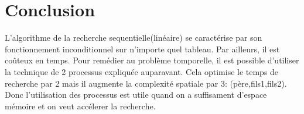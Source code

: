 \section{Conclusion}
L'algorithme de la recherche sequentielle(linéaire) se caractérise par son fonctionnement inconditionnel sur n'importe quel tableau. Par ailleurs, il est coûteux en temps. Pour remédier au problème tomporelle, il est possible d'utiliser  la technique de 2 processus expliquée auparavant. Cela optimise le temps de recherche par 2 mais il augmente la complexité spatiale par 3: (père,fils1,fils2). Donc l'utilisation des processus est utile quand on a suffisament d'espace mémoire et on veut accélerer la recherche.
